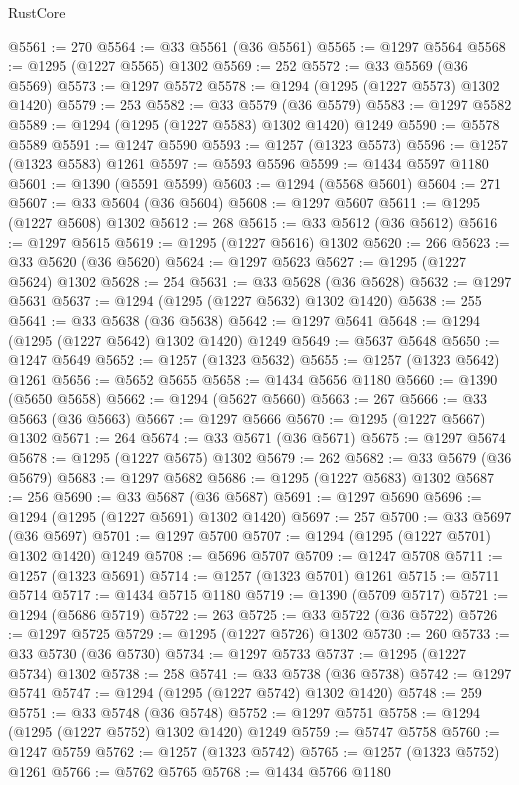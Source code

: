 \begin{lexlean}{RustCore}
\begin{coremodule}
@5561 := 270
@5564 := @33 @5561 (@36 @5561)
@5565 := @1297 @5564
@5568 := @1295 (@1227 @5565) @1302
@5569 := 252
@5572 := @33 @5569 (@36 @5569)
@5573 := @1297 @5572
@5578 := @1294 (@1295 (@1227 @5573) @1302 @1420)
@5579 := 253
@5582 := @33 @5579 (@36 @5579)
@5583 := @1297 @5582
@5589 := @1294 (@1295 (@1227 @5583) @1302 @1420) @1249
@5590 := @5578 @5589
@5591 := @1247 @5590
@5593 := @1257 (@1323 @5573)
@5596 := @1257 (@1323 @5583) @1261
@5597 := @5593 @5596
@5599 := @1434 @5597 @1180
@5601 := @1390 (@5591 @5599)
@5603 := @1294 (@5568 @5601)
@5604 := 271
@5607 := @33 @5604 (@36 @5604)
@5608 := @1297 @5607
@5611 := @1295 (@1227 @5608) @1302
@5612 := 268
@5615 := @33 @5612 (@36 @5612)
@5616 := @1297 @5615
@5619 := @1295 (@1227 @5616) @1302
@5620 := 266
@5623 := @33 @5620 (@36 @5620)
@5624 := @1297 @5623
@5627 := @1295 (@1227 @5624) @1302
@5628 := 254
@5631 := @33 @5628 (@36 @5628)
@5632 := @1297 @5631
@5637 := @1294 (@1295 (@1227 @5632) @1302 @1420)
@5638 := 255
@5641 := @33 @5638 (@36 @5638)
@5642 := @1297 @5641
@5648 := @1294 (@1295 (@1227 @5642) @1302 @1420) @1249
@5649 := @5637 @5648
@5650 := @1247 @5649
@5652 := @1257 (@1323 @5632)
@5655 := @1257 (@1323 @5642) @1261
@5656 := @5652 @5655
@5658 := @1434 @5656 @1180
@5660 := @1390 (@5650 @5658)
@5662 := @1294 (@5627 @5660)
@5663 := 267
@5666 := @33 @5663 (@36 @5663)
@5667 := @1297 @5666
@5670 := @1295 (@1227 @5667) @1302
@5671 := 264
@5674 := @33 @5671 (@36 @5671)
@5675 := @1297 @5674
@5678 := @1295 (@1227 @5675) @1302
@5679 := 262
@5682 := @33 @5679 (@36 @5679)
@5683 := @1297 @5682
@5686 := @1295 (@1227 @5683) @1302
@5687 := 256
@5690 := @33 @5687 (@36 @5687)
@5691 := @1297 @5690
@5696 := @1294 (@1295 (@1227 @5691) @1302 @1420)
@5697 := 257
@5700 := @33 @5697 (@36 @5697)
@5701 := @1297 @5700
@5707 := @1294 (@1295 (@1227 @5701) @1302 @1420) @1249
@5708 := @5696 @5707
@5709 := @1247 @5708
@5711 := @1257 (@1323 @5691)
@5714 := @1257 (@1323 @5701) @1261
@5715 := @5711 @5714
@5717 := @1434 @5715 @1180
@5719 := @1390 (@5709 @5717)
@5721 := @1294 (@5686 @5719)
@5722 := 263
@5725 := @33 @5722 (@36 @5722)
@5726 := @1297 @5725
@5729 := @1295 (@1227 @5726) @1302
@5730 := 260
@5733 := @33 @5730 (@36 @5730)
@5734 := @1297 @5733
@5737 := @1295 (@1227 @5734) @1302
@5738 := 258
@5741 := @33 @5738 (@36 @5738)
@5742 := @1297 @5741
@5747 := @1294 (@1295 (@1227 @5742) @1302 @1420)
@5748 := 259
@5751 := @33 @5748 (@36 @5748)
@5752 := @1297 @5751
@5758 := @1294 (@1295 (@1227 @5752) @1302 @1420) @1249
@5759 := @5747 @5758
@5760 := @1247 @5759
@5762 := @1257 (@1323 @5742)
@5765 := @1257 (@1323 @5752) @1261
@5766 := @5762 @5765
@5768 := @1434 @5766 @1180

\end{coremodule}
\end{lexlean}
